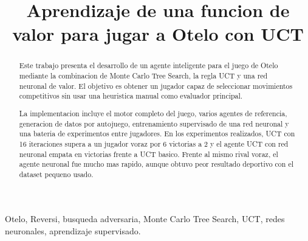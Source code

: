 \documentclass[conference,a4paper]{IEEEtran}
\begin{document}
\title{Aprendizaje de una funcion de valor para jugar a Otelo con UCT}

\author{
  
  \and
  
}

\maketitle

\begin{abstract}
Este trabajo presenta el desarrollo de un agente inteligente para el juego de
Otelo mediante la combinacion de Monte Carlo Tree Search, la regla UCT y una red
neuronal de valor. El objetivo es obtener un jugador capaz de seleccionar
movimientos competitivos sin usar una heuristica manual como evaluador principal.

La implementacion incluye el motor completo del juego, varios agentes de
referencia, generacion de datos por autojuego, entrenamiento supervisado de una
red neuronal y una bateria de experimentos entre jugadores. En los experimentos
realizados, UCT con 16 iteraciones supera a un jugador voraz por 6 victorias a 2
y el agente UCT con red neuronal empata en victorias frente a UCT basico. Frente
al mismo rival voraz, el agente neuronal fue mucho mas rapido, aunque obtuvo
peor resultado deportivo con el dataset pequeno usado.
\end{abstract}

\begin{IEEEkeywords}
Otelo, Reversi, busqueda adversaria, Monte Carlo Tree Search, UCT, redes
neuronales, aprendizaje supervisado.
\end{IEEEkeywords}
\end{document}
